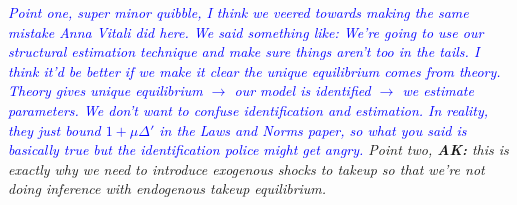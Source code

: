\documentclass{article}
\begin{document}
\emph{
    \textcolor{blue}{
Point one, super minor quibble, I think we veered towards making the same mistake Anna Vitali did here. We said something 
like: We're going to use our structural estimation technique and make sure things aren't too 
in the tails.
I think it'd be better if we make it clear the unique equilibrium comes from theory.
Theory gives unique equilibrium $\rightarrow$ our model is identified $\rightarrow$ we estimate parameters.
We don't want to confuse identification and estimation. In reality, they just bound 
$1 + \mu \Delta'$ in the Laws and Norms paper, so what you said is basically true but 
the identification police might get angry.}
Point two, \textbf{AK:} this is exactly why we need to introduce exogenous shocks to takeup 
so that we're not doing inference with endogenous takeup equilibrium.
}
\newline
\newline
\end{document}
